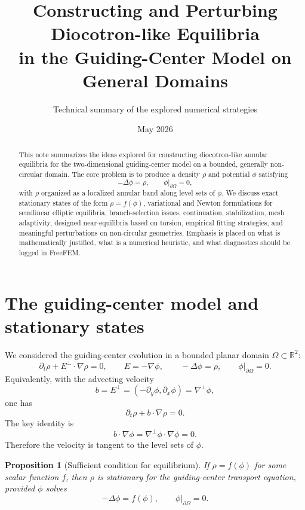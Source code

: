 \documentclass[11pt,a4paper]{article}
\title{Constructing and Perturbing Diocotron-like Equilibria\\in the Guiding-Center Model on General Domains}
\author{Technical summary of the explored numerical strategies}
\date{May 2026}
\newtheorem{proposition}{Proposition}
\newcommand{\Om}{\Omega}
\newcommand{\R}{\mathbb{R}}
\begin{document}
\maketitle

\begin{abstract}
This note summarizes the ideas explored for constructing diocotron-like annular equilibria for the two-dimensional guiding-center model on a bounded, generally non-circular domain. The core problem is to produce a density $\rho$ and potential $\phi$ satisfying
\[
  -\Delta \phi = \rho, \qquad \phi|_{\partial\Om}=0,
\]
with $\rho$ organized as a localized annular band along level sets of $\phi$. We discuss exact stationary states of the form $\rho=f(\phi)$, variational and Newton formulations for semilinear elliptic equilibria, branch-selection issues, continuation, stabilization, mesh adaptivity, designed near-equilibria based on torsion, empirical fitting strategies, and meaningful perturbations on non-circular geometries. Emphasis is placed on what is mathematically justified, what is a numerical heuristic, and what diagnostics should be logged in FreeFEM.
\end{abstract}

\tableofcontents
\newpage

\section{The guiding-center model and stationary states}

We considered the guiding-center evolution in a bounded planar domain $\Om\subset\R^2$:
\begin{equation}
  \partial_t \rho + E^\perp\cdot \nabla \rho = 0,
  \qquad
  E=-\nabla\phi,
  \qquad
  -\Delta\phi=\rho,
  \qquad
  \phi|_{\partial\Om}=0.
\end{equation}
Equivalently, with the advecting velocity
\begin{equation}
  b = E^\perp = (-\partial_y\phi,\partial_x\phi)=\nabla^\perp\phi,
\end{equation}
one has
\begin{equation}
  \partial_t\rho + b\cdot\nabla \rho=0.
\end{equation}
The key identity is
\begin{equation}
  b\cdot\nabla\phi = \nabla^\perp\phi\cdot\nabla\phi =0.
\end{equation}
Therefore the velocity is tangent to the level sets of $\phi$.

\begin{proposition}[Sufficient condition for equilibrium]
If $\rho=f(\phi)$ for some scalar function $f$, then $\rho$ is stationary for the guiding-center transport equation, provided $\phi$ solves
\begin{equation}
  -\Delta\phi=f(\phi),\qquad \phi|_{\partial\Om}=0.
\end{equation}
\end{proposition}
\end{document}
